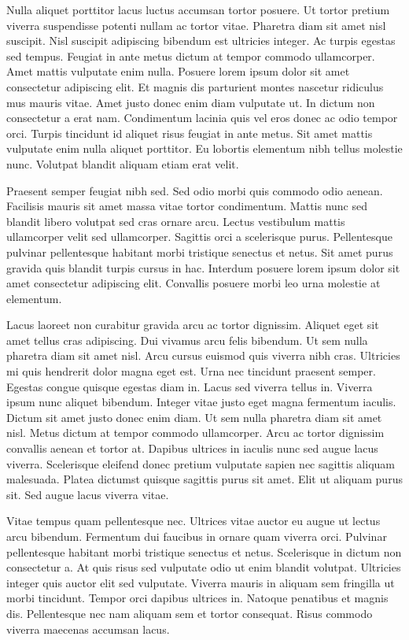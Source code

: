 \documentclass[11pt]{isr} %
\begin{document}
Nulla aliquet porttitor lacus luctus accumsan tortor posuere. Ut tortor pretium viverra suspendisse potenti nullam ac tortor vitae. Pharetra diam sit amet nisl suscipit. Nisl suscipit adipiscing bibendum est ultricies integer. Ac turpis egestas sed tempus. Feugiat in ante metus dictum at tempor commodo ullamcorper. Amet mattis vulputate enim nulla. Posuere lorem ipsum dolor sit amet consectetur adipiscing elit. Et magnis dis parturient montes nascetur ridiculus mus mauris vitae. Amet justo donec enim diam vulputate ut. In dictum non consectetur a erat nam. Condimentum lacinia quis vel eros donec ac odio tempor orci. Turpis tincidunt id aliquet risus feugiat in ante metus. Sit amet mattis vulputate enim nulla aliquet porttitor. Eu lobortis elementum nibh tellus molestie nunc. Volutpat blandit aliquam etiam erat velit.

Praesent semper feugiat nibh sed. Sed odio morbi quis commodo odio aenean. Facilisis mauris sit amet massa vitae tortor condimentum. Mattis nunc sed blandit libero volutpat sed cras ornare arcu. Lectus vestibulum mattis ullamcorper velit sed ullamcorper. Sagittis orci a scelerisque purus. Pellentesque pulvinar pellentesque habitant morbi tristique senectus et netus. Sit amet purus gravida quis blandit turpis cursus in hac. Interdum posuere lorem ipsum dolor sit amet consectetur adipiscing elit. Convallis posuere morbi leo urna molestie at elementum.

Lacus laoreet non curabitur gravida arcu ac tortor dignissim. Aliquet eget sit amet tellus cras adipiscing. Dui vivamus arcu felis bibendum. Ut sem nulla pharetra diam sit amet nisl. Arcu cursus euismod quis viverra nibh cras. Ultricies mi quis hendrerit dolor magna eget est. Urna nec tincidunt praesent semper. Egestas congue quisque egestas diam in. Lacus sed viverra tellus in. Viverra ipsum nunc aliquet bibendum. Integer vitae justo eget magna fermentum iaculis. Dictum sit amet justo donec enim diam. Ut sem nulla pharetra diam sit amet nisl. Metus dictum at tempor commodo ullamcorper. Arcu ac tortor dignissim convallis aenean et tortor at. Dapibus ultrices in iaculis nunc sed augue lacus viverra. Scelerisque eleifend donec pretium vulputate sapien nec sagittis aliquam malesuada. Platea dictumst quisque sagittis purus sit amet. Elit ut aliquam purus sit. Sed augue lacus viverra vitae.

Vitae tempus quam pellentesque nec. Ultrices vitae auctor eu augue ut lectus arcu bibendum. Fermentum dui faucibus in ornare quam viverra orci. Pulvinar pellentesque habitant morbi tristique senectus et netus. Scelerisque in dictum non consectetur a. At quis risus sed vulputate odio ut enim blandit volutpat. Ultricies integer quis auctor elit sed vulputate. Viverra mauris in aliquam sem fringilla ut morbi tincidunt. Tempor orci dapibus ultrices in. Natoque penatibus et magnis dis. Pellentesque nec nam aliquam sem et tortor consequat. Risus commodo viverra maecenas accumsan lacus.
\end{document}
